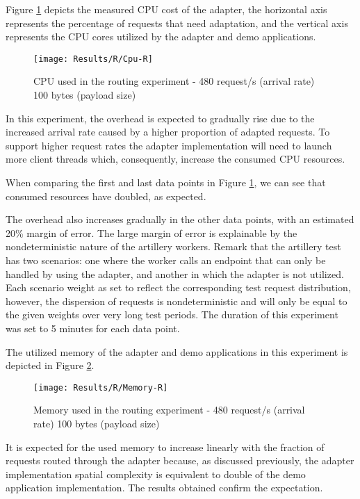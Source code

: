 Figure \ref{fig:routCpu} depicts the measured CPU cost of the adapter, the horizontal axis represents the percentage of requests that need adaptation, and the vertical axis represents the
CPU cores utilized by the adapter and demo applications.

\begin{figure}[htbp]
    \centering
    \centerline{\texttt{[image: Results/R/Cpu-R]}}
    \caption{CPU used in the routing experiment - 480 request/s (arrival rate) 100 bytes (payload size)}
    \label{fig:routCpu}
\end{figure}

In this experiment, the overhead is expected to gradually rise due to the increased arrival rate caused by a higher proportion of adapted requests.
To support higher request rates the adapter implementation will need to launch more client threads which, consequently, increase the consumed CPU resources.

When comparing the first and last data points in Figure \ref{fig:routCpu}, we can see that consumed resources have doubled, as expected.

The overhead also increases gradually in the other data points, with an estimated 20\% margin of error.
The large margin of error is explainable by the nondeterministic nature of the artillery workers.
Remark that the artillery test has two scenarios: one where the worker calls an endpoint that can only be handled by using the adapter, and another in which the adapter is not utilized.
Each scenario weight as set to reflect the corresponding test request distribution,
however, the dispersion of requests is nondeterministic and will only be equal to the given weights over very long test periods.
The duration of this experiment was set to 5 minutes for each data point.

The utilized memory of the adapter and demo applications in this experiment is depicted in Figure \ref{fig:routMem}.

\begin{figure}[htbp]
    \centering
    \centerline{\texttt{[image: Results/R/Memory-R]}}
    \caption{Memory used in the routing experiment - 480 request/s (arrival rate) 100 bytes (payload size)}
    \label{fig:routMem}
\end{figure}

It is expected for the used memory to increase linearly with the fraction of requests routed through the adapter because, as discussed previously,
the adapter implementation spatial complexity is equivalent to double of the demo application implementation.
The results obtained confirm the expectation.

